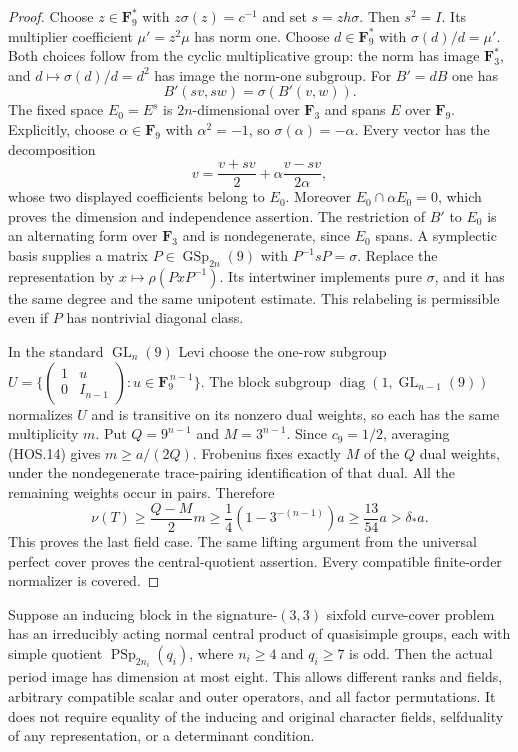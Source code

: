 \begin{proof}
Choose $z\in\mathbf F_9^*$ with $z\sigma(z)=c^{-1}$ and set
$s=zh\sigma$. Then $s^2=I$. Its multiplier coefficient
$\mu'=z^2\mu$ has norm one. Choose $d\in\mathbf F_9^*$ with
$\sigma(d)/d=\mu'$. Both choices follow from the cyclic
multiplicative group: the norm has image $\mathbf F_3^*$,
and $d\mapsto\sigma(d)/d=d^2$ has image the norm-one subgroup.
For $B'=dB$ one has
\[
                         B'(sv,sw)=\sigma(B'(v,w)).          \tag{HOS.28}
\]
The fixed space $E_0=E^s$ is $2n$-dimensional over $\mathbf F_3$
and spans $E$ over $\mathbf F_9$. Explicitly, choose
$\alpha\in\mathbf F_9$ with $\alpha^2=-1$, so
$\sigma(\alpha)=-\alpha$. Every vector has the decomposition
\[
             v=\frac{v+sv}{2}
                 +\alpha\frac{v-sv}{2\alpha},              \tag{HOS.29}
\]
whose two displayed coefficients belong to $E_0$.
Moreover $E_0\cap\alpha E_0=0$, which proves the dimension
and independence assertion. The restriction of $B'$ to $E_0$
is an alternating form over $\mathbf F_3$ and is nondegenerate,
since $E_0$ spans. A symplectic basis supplies a matrix
$P\in\operatorname{GSp}_{2n}(9)$ with
$P^{-1}sP=\sigma$. Replace the representation by
$x\mapsto\rho(PxP^{-1})$. Its intertwiner implements pure
$\sigma$, and it has the same degree and the same unipotent
estimate. This relabeling is permissible even if $P$ has
nontrivial diagonal class.

In the standard $\operatorname{GL}_n(9)$ Levi choose the
one-row subgroup
$U=\{\left(\begin{smallmatrix}1&u\\0&I_{n-1}\end{smallmatrix}\right)
:u\in\mathbf F_9^{\,n-1}\}$.
The block subgroup $\operatorname{diag}(1,\operatorname{GL}_{n-1}(9))$
normalizes $U$ and is transitive on its nonzero dual weights,
so each has the same multiplicity $m$. Put $Q=9^{n-1}$ and
$M=3^{n-1}$.
Since $c_9=1/2$, averaging (HOS.14) gives $m\ge a/(2Q)$.
Frobenius fixes exactly $M$ of the $Q$ dual weights, under
the nondegenerate trace-pairing identification of that dual.
All the remaining weights occur in pairs. Therefore
\[
 \nu(T)\ge\frac{Q-M}{2}m
      \ge\frac14(1-3^{-(n-1)})a
      \ge\frac{13}{54}a>\delta_*a.                          \tag{HOS.30}
\]
This proves the last field case. The same lifting argument
from the universal perfect cover proves the central-quotient
assertion. Every compatible finite-order normalizer is covered.
\end{proof}

\begin{theorem}
\label{D-HOS-06}
Suppose an inducing block in the signature-$(3,3)$ sixfold
curve-cover problem has an irreducibly acting normal central product
of quasisimple groups, each with simple quotient
$\operatorname{PSp}_{2n_i}(q_i)$, where $n_i\ge4$ and
$q_i\ge7$ is odd. Then the actual period image has dimension
at most eight. This allows different ranks and fields, arbitrary
compatible scalar and outer operators, and all factor permutations.
It does not require equality of the inducing and original character
fields, selfduality of any representation, or a determinant condition.
\end{theorem}

